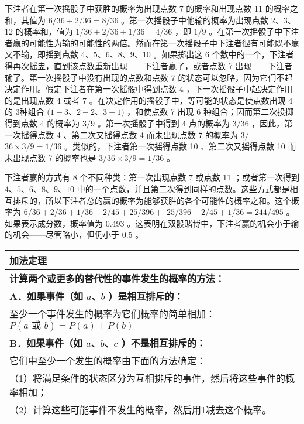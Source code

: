 下注者在第一次摇骰子中获胜的概率为出现点数 7 的概率和出现点数 11 的概率之和，其值为 $6 / 36+2 / 36=8 / 36$ 。第一次摇骰子中他输的概率为出现点数 $2$、$3$、$12$ 的概率和，值为 $1 / 36+2 / 36+1 / 36=4 / 36$ ，即 $1 / 9$ 。在第一次摇骰子中下注者赢的可能性为输的可能性的两倍。然而在第一次摇骰子中下注者很有可能既不赢又不输，即摇到点数 $4$、$5$、$6$、$8$、$9$、$10$ 。如果掷出这 6 个数中的一个，下注者得再次摇盅，直到该点数重新出现——下注者赢了，或者点数 7 出现——下注者输了。第一次摇骰子中没有出现的点数和点数 7 的状态可以忽略，因为它们不起决定作用。假定下注者在第一次摇骰中得到点数 4 ，下一次摇骰子中起决定作用的是出现点数 4 或者 7 。在决定作用的摇骰子中，等可能的状态是使点数出现 4 的 3种组合 $(1-3$、$2-2$、$3-1)$ ，和使点数 7 出现 6 种组合；因而第二次投掷得到点数 4 的概率为 $3 / 9$ 。第一次摇骰子中得到 4 点的概率为 $3 / 36$ ，因此，第一次摇得点数 4 、第二次又摇得点数 4 而未出现点数 7 的概率为 $3 /$ $36 \times 3 / 9=1 / 36$ 。类似的，下注者第一次摇得点数 10 、第二次又摇得点数 10 而未出现点数 7 的概率也是 $3 / 36 \times 3 / 9=1 / 36$ 。

下注者赢的方式有 8 个不同种类：第一次出现点数 7 或点数 11 ；或者第一次得到 $4$、$5$、$6$、$8$、$9$、$10$ 中的一个点数，并且第二次得到同样的点数。这些方式都是相互排斥的，所以下注者总的赢的概率为能够获胜的各个可能性的概率之和。这个概率为 $6 / 36+2 / 36+1 / 36+2 / 45+25 / 396+$ $25 / 396+2 / 45+1 / 36=244 / 495$ 。如果表示成分数，概率值为 0.493 。这表明在双骰赌博中，下注者赢的机会小于输的机会——尽管略小，但仍小于 0.5 。

\begin{center}
\begin{tabular}{|p{}|}
\hline
\textbf{加法定理} \\
\hline
\textbf{计算两个或更多的替代性的事件发生的概率的方法：} \\[6pt]
\textbf{A．如果事件（如 $a$、$b$ ）是相互排斥的：} \\
至少一个事件发生的概率为它们概率的简单相加：
$P(a \text { 或 } b) = P(a)+P(b)$ \\[6pt]
\textbf{B．如果事件（如 $a$、$b$、$c$ ）不是相互排斥的：} \\
它们中至少一个发生的概率由下面的方法确定： \\
（1）将满足条件的状态区分为互相排斥的事件，然后将这些事件的概率相加； \\
（2）计算这些可能事件不发生的概率，然后用1减去这个概率。 \\
\hline
\end{tabular}
\end{center}

